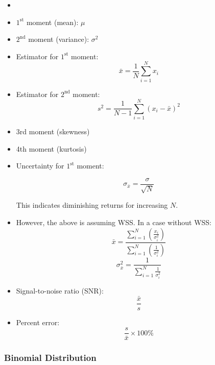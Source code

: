 \begin{itemize}
    \item
    \item $1^\text{st}$ moment (mean): $\mu$
    \item $2^\text{nd}$ moment (variance): $\sigma^2$
    \item Estimator for $1^\text{st}$ moment:
          \begin{equation*}
              \bar{x} = \frac{1}{N} \sum_{i=1}^{N} x_i
          \end{equation*}
    \item Estimator for $2^\text{nd}$ moment:
          \begin{equation*}
              s^2 = \frac{1}{N-1} \sum_{i=1}^{N} (x_i - \bar{x})^2
          \end{equation*}
    \item 3rd moment (skewness)
    \item 4th moment (kurtosis)
    \item Uncertainty for $1^\text{st}$ moment:

          \begin{equation*}
              \sigma_{\bar{x}} = \frac{\sigma}{\sqrt{N}}
          \end{equation*}

          This indicates diminishing returns for increasing $N$.
    \item However, the above is assuming WSS. In a case without WSS:
          \begin{equation*}
              \bar{x} = \frac{\sum_{i=1}^{N}\left(\frac{x_i}{\sigma_i^2}\right)}{\sum_{i=1}^{N} \left(\frac{1}{\sigma_i^2}\right)}
          \end{equation*}
          \begin{equation*}
              \sigma_{\bar{x}}^2 = \frac{1}{\sum_{i=1}^{N} \frac{1}{\sigma_i^2}}
          \end{equation*}
    \item Signal-to-noise ratio (SNR):
          \begin{equation*}
              \frac{\bar{x}}{s}
          \end{equation*}
    \item Percent error:
          \begin{equation*}
              \frac{s}{\bar{x}} \times 100\%
          \end{equation*}
\end{itemize}

\subsubsection{Binomial Distribution}

